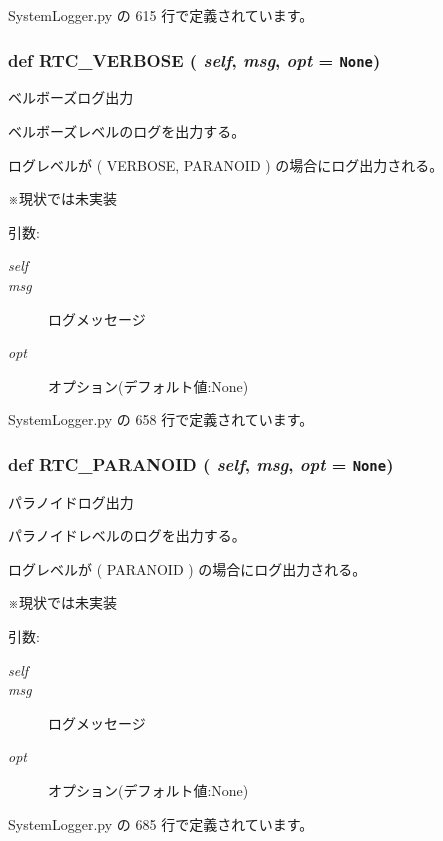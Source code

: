  SystemLogger.py の 615 行で定義されています。
\subsubsection{\setlength{\rightskip}{0pt plus 5cm}def RTC\_\-VERBOSE ( {\em self},  {\em msg},  {\em opt} = {\tt None})}\label{classsource__py_1_1_system_logger_1_1_log_stream_85327144fae4485fb5dc398ed96dc89f}


ベルボーズログ出力 

ベルボーズレベルのログを出力する。\par
ログレベルが ( VERBOSE, PARANOID ) の場合にログ出力される。\par
 ※現状では未実装

\begin{Desc}
\item[引数:]
\begin{description}
\item[{\em self}]\item[{\em msg}]ログメッセージ \item[{\em opt}]オプション(デフォルト値:None) \end{description}
\end{Desc}


 SystemLogger.py の 658 行で定義されています。
\subsubsection{\setlength{\rightskip}{0pt plus 5cm}def RTC\_\-PARANOID ( {\em self},  {\em msg},  {\em opt} = {\tt None})}\label{classsource__py_1_1_system_logger_1_1_log_stream_6b9e7faf67b50a301d44b4f2bb389dd4}


パラノイドログ出力 

パラノイドレベルのログを出力する。\par
ログレベルが ( PARANOID ) の場合にログ出力される。\par
 ※現状では未実装

\begin{Desc}
\item[引数:]
\begin{description}
\item[{\em self}]\item[{\em msg}]ログメッセージ \item[{\em opt}]オプション(デフォルト値:None) \end{description}
\end{Desc}


 SystemLogger.py の 685 行で定義されています。
